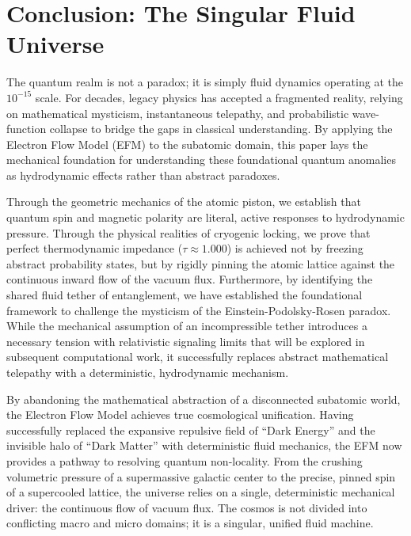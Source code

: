 \documentclass[11pt, a4paper]{article}
\begin{document}
\section{Conclusion: The Singular Fluid Universe}
  The quantum realm is not a paradox; it is simply fluid dynamics operating at the $10^{-15}$ scale. For decades, legacy physics has accepted a fragmented reality, relying on mathematical mysticism, instantaneous telepathy, and probabilistic wave-function collapse to bridge the gaps in classical understanding. By applying the Electron Flow Model (EFM) to the subatomic domain, this paper lays the mechanical foundation for understanding these foundational quantum anomalies as hydrodynamic effects rather than abstract paradoxes.

  Through the geometric mechanics of the atomic piston, we establish that quantum spin and magnetic polarity are literal, active responses to hydrodynamic pressure. Through the physical realities of cryogenic locking, we prove that perfect thermodynamic impedance ($\tau \approx 1.000$) is achieved not by freezing abstract probability states, but by rigidly pinning the atomic lattice against the continuous inward flow of the vacuum flux. Furthermore, by identifying the shared fluid tether of entanglement, we have established the foundational framework to challenge the mysticism of the Einstein-Podolsky-Rosen paradox. While the mechanical assumption of an incompressible tether introduces a necessary tension with relativistic signaling limits that will be explored in subsequent computational work, it successfully replaces abstract mathematical telepathy with a deterministic, hydrodynamic mechanism.

  By abandoning the mathematical abstraction of a disconnected subatomic world, the Electron Flow Model achieves true cosmological unification. Having successfully replaced the expansive repulsive field of ``Dark Energy'' \cite{marabut2026m11} and the invisible halo of ``Dark Matter'' \cite{marabut2026m12} with deterministic fluid mechanics, the EFM now provides a pathway to resolving quantum non-locality. From the crushing volumetric pressure of a supermassive galactic center \cite{marabut2026m10} to the precise, pinned spin of a supercooled lattice, the universe relies on a single, deterministic mechanical driver: the continuous flow of vacuum flux. The cosmos is not divided into conflicting macro and micro domains; it is a singular, unified fluid machine.
\end{document}
